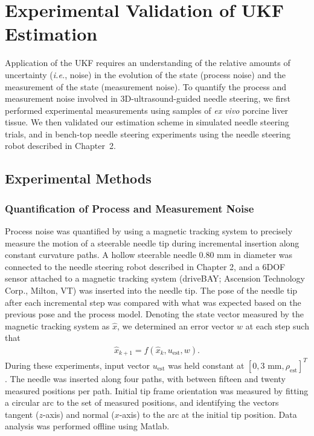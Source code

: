 \section[Experimental Validation of UKF Estimation]{Experimental Validation of UKF Estimation}
\label{sec:AutonomousControl}
Application of the UKF requires an understanding of the relative amounts of uncertainty (\textit{i.e.}, noise) in the evolution of the state (process noise) and the measurement of the state (measurement noise). To quantify the process and measurement noise involved in 3D-ultrasound-guided needle steering, we first performed experimental measurements using samples of \textit{ex vivo} porcine liver tissue. We then validated our estimation scheme in simulated needle steering trials, and in bench-top needle steering experiments using the needle steering robot described in Chapter~2.

\subsection{Experimental Methods}
\subsubsection{Quantification of Process and Measurement Noise}
Process noise was quantified by using a magnetic tracking system to precisely measure the motion of a steerable needle tip during incremental insertion along constant curvature paths. A hollow steerable needle 0.80 mm in diameter was connected to the needle steering robot described in Chapter 2, and a 6DOF sensor attached to a magnetic tracking system (driveBAY; Ascension Technology Corp., Milton, VT) was inserted into the needle tip. The pose of the needle tip after each incremental step was compared with what was expected based on the previous pose and the process model. Denoting the state vector measured by the magnetic tracking system as $\hat{{x}}$, we determined an error vector ${w}$ at each step such that
\begin{align}
{\hat{x}_{k+1}} = f({\hat{x}_{k}}, {u_{\text{est}}}, {w}).
\end{align}
During these experiments, input vector ${u_{\text{est}}}$ was held constant at $[0, \text{3 mm}, \rho_{\text{est}}]^{T}$. The needle was inserted along four paths, with between fifteen and twenty measured positions per path. Initial tip frame orientation was measured by fitting a circular arc to the set of measured positions, and identifying the vectors tangent ($z$-axis) and normal ($x$-axis) to the arc at the initial tip position. Data analysis was performed offline using Matlab. 


